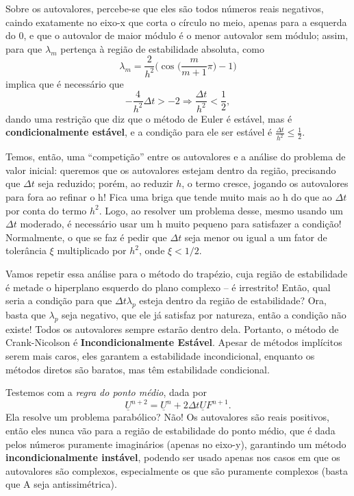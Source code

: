 \documentclass[../differential_methods.tex]{subfiles}
\begin{document}
Sobre os autovalores, percebe-se que eles são todos números reais negativos, caindo exatamente no eixo-x que corta o círculo no meio, apenas para a esquerda do 0, e que o autovalor de maior módulo é o menor autovalor sem módulo; assim, para que \(\lambda_{m}\) pertença à região de estabilidade absoluta, como
\[
	\lambda_{m} = \frac{2}{h^{2}}\biggl(\cos^{}{\biggl(\frac{m}{m+1}\pi \biggr)}-1\biggr)
\]
implica que é necessário que
\[
	-\frac{4}{h^{2}}\Delta t > -2 \Rightarrow \frac{\Delta t}{h^{2}} < \frac{1}{2},
\]
dando uma restrição que diz que o método de Euler é estável, mas é \textbf{condicionalmente estável}, e a condição para ele ser estável é \(\displaystyle \frac{\Delta t}{h^{2}}\leq \frac{1}{2}\).

Temos, então, uma ``competição'' entre os autovalores e a análise do problema de valor inicial: queremos que os autovalores estejam dentro da região, precisando que \(\Delta t\) seja reduzido; porém, ao reduzir \(h\), o termo cresce, jogando os autovalores para fora ao refinar o h! Fica uma briga que tende muito mais ao h do que ao \(\Delta t\) por conta do termo \(h^{2}\). Logo, ao resolver um problema desse, mesmo usando um \(\Delta t\) moderado, é necessário usar um h muito pequeno para satisfazer a condição!
Normalmente, o que se faz é pedir que \(\Delta t\) seja menor ou igual a um fator de tolerância \(\xi \) multiplicado por \(h^{2}\), onde \(\xi < 1/2\).

Vamos repetir essa análise para o método do trapézio, cuja região de estabilidade é metade o hiperplano esquerdo do plano complexo -- é irrestrito! Então, qual seria a condição para que \(\Delta t \lambda_p\) esteja dentro da região de estabilidade? Ora, basta que \(\lambda_p\) seja negativo, que ele já satisfaz por natureza, então a condição não existe! Todos os autovalores sempre estarão dentro dela. Portanto, o método de Crank-Nicolson é \textbf{Incondicionalmente Estável}.
Apesar de métodos implícitos serem mais caros, eles garantem a estabilidade incondicional, enquanto os métodos diretos são baratos, mas têm estabilidade condicional.

Testemos com a \textit{regra do ponto médio}, dada por
\[
	\boxed{\underline{U}^{n+2} = \underline{U}^{n} + 2\Delta t \underline{U}F^{n+1}}.
\]
Ela resolve um problema parabólico? Não! Os autovalores são reais positivos, então eles nunca vão para a região de estabilidade do ponto médio, que é dada pelos números puramente imaginários (apenas no eixo-y), garantindo um método \textbf{incondicionalmente instável}, podendo ser usado apenas nos casos em que os autovalores são complexos, especialmente os que são puramente complexos (basta que A seja antissimétrica).
\end{document}
